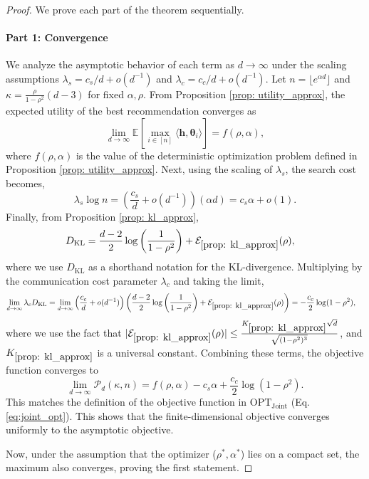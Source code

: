 \documentclass[12pt]{article}
\theoremstyle{definition}
\theoremstyle{remark}
\begin{document}
\begin{proof}
We prove each part of the theorem sequentially.

\paragraph{Part 1: Convergence}
We analyze the asymptotic behavior of each term as $d \to \infty$ under the scaling assumptions $\lambda_s = c_s/d + o(d^{-1})$ and $\lambda_c = c_c/d + o(d^{-1})$. Let $n = \lfloor e^{\alpha d} \rfloor$ and $\kappa = \frac{\rho}{1-\rho^2}(d-3)$ for fixed $\alpha, \rho$. From Proposition \ref{prop: utility_approx}, the expected utility of the best recommendation converges as
\begin{equation*}
   \lim_{d\rightarrow \infty} \mathbb{E}\left[\max_{i \in [n]} \langle \mathbf h, \boldsymbol\theta_i \rangle\right] = f(\rho, \alpha),
\end{equation*}
where $f(\rho, \alpha)$ is the value of the deterministic optimization problem defined in Proposition \ref{prop: utility_approx}. Next, using the scaling of $\lambda_s$, the search cost becomes,
\begin{equation*}
    \lambda_s \log n = \left(\frac{c_s}{d} + o(d^{-1})\right) (\alpha d) = c_s \alpha + o(1).
\end{equation*}
Finally, from Proposition \ref{prop: kl_approx},
\begin{align*}
    D_{\text{KL}} &=  \frac{d-2}{2} \log \left(\frac{1}{1-\rho^2}\right) + \mathcal{E}_{\ref{prop: kl_approx}}(\rho),
\end{align*}
where we use $D_{\text{KL}}$ as a shorthand notation for the KL-divergence. Multiplying by the communication cost parameter $\lambda_c$ and taking the limit,
\begin{align*}
   \lim_{d\rightarrow \infty} \lambda_c D_{\text{KL}} &= \lim_{d\rightarrow \infty} \left(\frac{c_c}{d} + o(d^{-1})\right) \left(\frac{d-2}{2} \log \left(\frac{1}{1-\rho^2}\right) + \mathcal{E}_{\ref{prop: kl_approx}}(\rho)\right) = -\frac{c_c}{2} \log (1-\rho^2),
\end{align*}
where we use the fact that $|\mathcal{E}_{\ref{prop: kl_approx}}(\rho)| \leq \frac{K_{\ref{prop: kl_approx}} \sqrt{d}}{\sqrt{(1-\rho^2)^3}}$, and $K_{\ref{prop: kl_approx}}$ is a universal constant. Combining these terms, the objective function converges to
\begin{equation*}
    \lim_{d \to \infty} \mathcal{P}_d(\kappa, n) = f(\rho, \alpha) - c_s \alpha + \frac{c_c}{2} \log(1-\rho^2).
\end{equation*}
This matches the definition of the objective function in $\mathrm{OPT}_{\mathrm{Joint}}$ (Eq. \eqref{eq:joint_opt}). This shows that the finite-dimensional objective converges uniformly to the asymptotic objective. {Now, under the assumption that the optimizer ($\rho^* , \alpha^*$) lies on a compact set, the maximum also converges, proving the first statement.

}
\end{proof}
\end{document}
